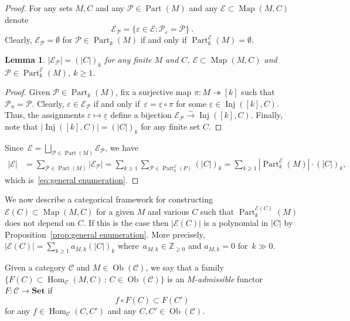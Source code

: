 \documentclass[12pt, reqno]{amsart}
\newtheorem{lemma}[theorem]{Lemma}
\theoremstyle{definition}
\numberwithin{equation}{section}
\newcommand{\ZZ}{{\mathbb Z}}
\DeclareMathOperator*{\Ob}{Ob}
\DeclareMathOperator{\Hom}{Hom}
\DeclareMathOperator{\Inj}{Inj}
\DeclareMathOperator{\Map}{Map}
\DeclareMathOperator{\Part}{Part}
\newcommand{\EE}{{\mathcal{E}}}
\newcommand{\PP}{{\mathcal {P}}}
\begin{document}
\begin{proof} 

For any sets $M,C$ and any $\mathcal P\in \Part(M)$ and any $\EE\subset \Map(M,C)$ denote
\begin{equation}
\EE_\PP=\{\varepsilon \in \EE  :  \PP_\varepsilon = \PP\} \ .
\end{equation}
Clearly, $\EE_\PP= \emptyset$ for $\PP\in \Part_k(M)$ if and only if $\Part_k^\EE(M)=\emptyset$.
 

\begin{lemma} $|\EE_\PP|=(|C|)_k$ for any finite $M$ and $C$, $\EE\subset \Map(M,C)$ and $\mathcal P\in \Part_k^\EE(M)$, $k\ge 1$. 
\end{lemma}

\begin{proof}
Given $\PP\in \Part_k(M)$, fix a surjective map $\pi:M\twoheadrightarrow [k]$ such that $\PP_\pi=\PP$. 
Clearly, $\varepsilon\in \EE_\PP$  if and only if~$\varepsilon=\underline \varepsilon\circ \pi$ for some $\underline \varepsilon\in  \Inj([k],C)$. Thus, the assignments $\varepsilon\mapsto \underline \varepsilon$ define a 
bijection $\EE_\PP\xrightarrow{\sim} \Inj([k],C)$.
Finally, note that $|\Inj([k],C)|=(|C|)_k$ for any finite set $C$.
\end{proof}
Since~$\mathcal E=\bigsqcup_{\mathcal P\in\Part(M)} \EE_\PP$, we have 
\begin{align*}|\EE| &=\sum\limits_{\PP\in \Part(M)}|\EE_\PP|=\sum\limits_{k\ge 1} \sum\limits_{\PP\in \Part_k^\EE(P)} (|C|)_k=\sum\limits_{k\ge 1} |\Part_k^\EE(M)|\cdot (|C|)_k,
\end{align*}
which is~\eqref{eq:general enumeration}.
\end{proof}

We now describe a categorical framework for constructing $\EE(C)\subset \Map(M,C)$ for a given $M$ and various $C$ such that $\Part_k^{\EE(C)}(M)$ does not depend on $C$. If this is the case then $|\EE(C)|$ is a polynomial in $|C|$ by Proposition~\ref{prop:general enumeration}. More precisely, $|\EE(C)|=\sum_{k\ge 1} 
a_{M,k}(|C|)_k$ where~$a_{M,k}\in\ZZ_{\ge 0}$
and $a_{M,k}=0$ for~$k\gg0$.

Given a category  ${\mathcal C}$  and $M\in \Ob({\mathcal C})$, we say that a  family $\{F(C)\subset \Hom_{\mathcal C}(M,C)\,:\,C\in \Ob({\mathcal C})\}$ 
is an $M$-{\it admissible} functor  $F:{\mathcal C}\to \mathbf{Set}$ if 
\begin{equation}
\label{eq:functoriality of F}
f\circ F(C)\subset F(C')
\end{equation}
for any $f\in \Hom_{\mathcal C}(C,C')$ and any $C,C'\in \Ob({\mathcal C})$.
\end{document}
